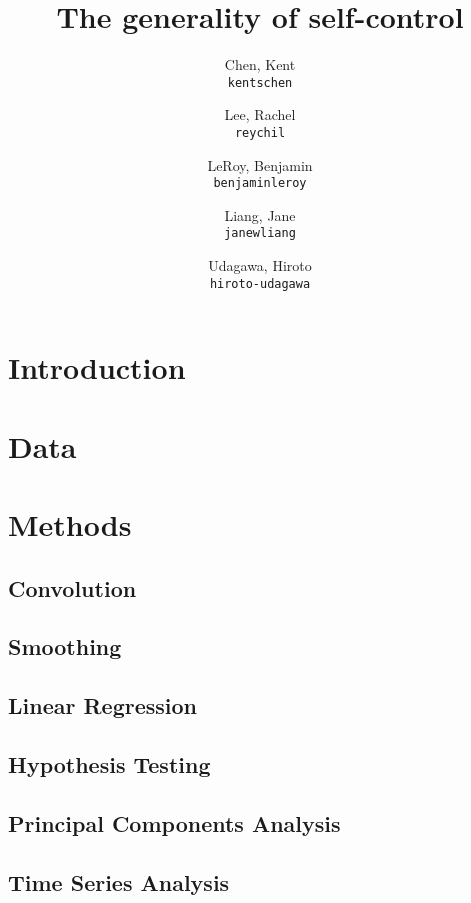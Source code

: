 \documentclass[11pt]{article}
\title{The generality of self-control}
\author{
  Chen, Kent\\
  \texttt{kentschen}
  \and
  Lee, Rachel\\
  \texttt{reychil}
  \and
  LeRoy, Benjamin\\
  \texttt{benjaminleroy}
  \and
  Liang, Jane\\
  \texttt{janewliang}
  \and
  Udagawa, Hiroto\\
  \texttt{hiroto-udagawa}
}
\begin{document}
\maketitle

\abstract{}

\section{Introduction}
	

\section{Data}

	
	
\section{Methods}

	\subsection{Convolution}
		

	\subsection{Smoothing}
	
		
		
	\subsection{Linear Regression}
	
		
		
	\subsection{Hypothesis Testing}
	
		
		
	\subsection{Principal Components Analysis}
	
		
		
	\subsection{Time Series Analysis}
	
\end{document}
